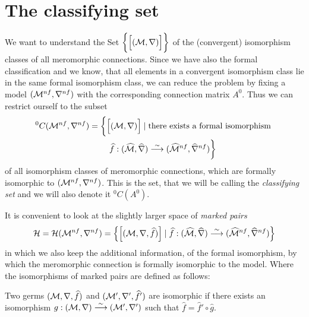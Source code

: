 \section{The classifying set}
We want to understand the Set
$\bigg\{\Big[(\mathcal{M},\nabla)\Big]\bigg\}$ of the (convergent)
isomorphism classes of all meromorphic connections. Since we have also the
formal classification and we know, that all elements in a convergent
isomorphism class lie in the same formal isomorphism class, we can reduce the
problem by fixing a model $(\mathcal{M}^{nf},\nabla^{nf})$ with the corresponding
connection matrix $A^0$. Thus we can restrict ourself to the subset
\begin{multline*}
  {}^0C(\mathcal{M}^{nf},\nabla^{nf})=\bigg\{
    \Big[(\mathcal{M},\nabla)\Big]
    \mid \text{there exists a formal isomorphism }
  \\\qquad\widehat f:(\widehat{\mathcal{M}},\widehat\nabla)
      \overset{\sim}\longrightarrow
      (\widehat{\mathcal{M}}^{nf},\widehat\nabla^{nf})
  \bigg\}
\end{multline*}
of all isomorphism classes of meromorphic connections, which are formally
isomorphic to $(\mathcal{M}^{nf},\nabla^{nf})$. This is the set, that we will be
calling the \emph{classifying set} and we will also denote it ${}^0C(A^0)$.
\begin{comment}
  \begin{itemize}
    \item \cite{thboalch} p.6
      \begin{itemize}
        \item \cite{boalch} p.19
      \end{itemize}
    \item \cite{Loday1994} p.852
    \item \cite{sabbah2007isomonodromic} p.111
    \item \cite{babbitt1983}
  \end{itemize}
\end{comment}

It is convenient to look at the slightly larger space of \emph{marked pairs}
\[
  \mathcal{H}=\mathcal{H}(\mathcal{M}^{nf},\nabla^{nf})=\left\{
    \left[(\mathcal{M},\nabla,\widehat f)\right]
      \mid
      \widehat f:(\widehat{\mathcal{M}},\widehat\nabla)
        \overset{\sim}\longrightarrow
        (\widehat{\mathcal{M}}^{nf},\widehat\nabla^{nf})
  \right\}
\]
in which we also keep the additional information, of the formal isomorphism, by
which the meromorphic connection is formally isomorphic to the model.
Where the isomorphisms of marked pairs are defined as follows:
\begin{defn}
  Two germs $(\mathcal{M},\nabla,\widehat f)$ and $(\mathcal{M}',\nabla',\widehat f')$ are
  isomorphic if there exists an isomorphism
  $g:(\mathcal{M},\nabla)\overset{\sim}\longrightarrow(\mathcal{M}',\nabla')$ such that
  $\hat f=\hat f'\circ \hat g$.
  \begin{comment}
    \cite[111]{sabbah2007isomonodromic}:\dots it is important to remark that
    such an isomorphism is then unique.
  \end{comment}
\end{defn}

